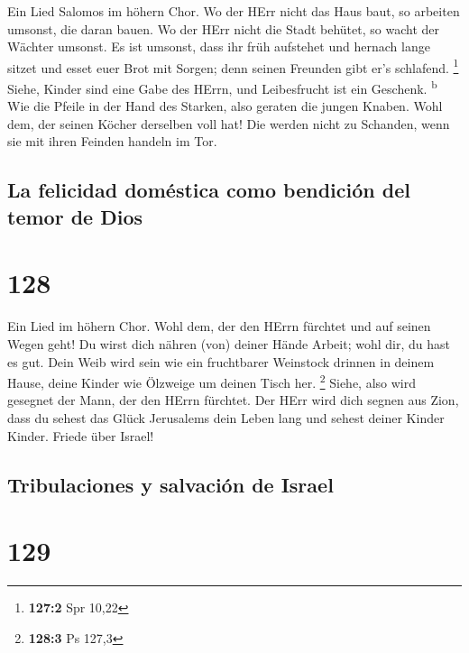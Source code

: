  Ein Lied Salomos im höhern Chor. Wo der HErr nicht das
Haus baut, so arbeiten umsonst, die daran bauen. Wo der HErr nicht die
Stadt behütet, so wacht der Wächter umsonst.  Es ist
umsonst, dass ihr früh aufstehet und hernach lange sitzet und esset euer
Brot mit Sorgen; denn seinen Freunden gibt er's schlafend. \footnote{\textbf{127:2}
  Spr 10,22}  Siehe, Kinder sind eine Gabe des HErrn, und
Leibesfrucht ist ein Geschenk. \textsuperscript{b}  Wie
die Pfeile in der Hand des Starken, also geraten die jungen Knaben.
 Wohl dem, der seinen Köcher derselben voll hat! Die
werden nicht zu Schanden, wenn sie mit ihren Feinden handeln im Tor.

\hypertarget{la-felicidad-domuxe9stica-como-bendiciuxf3n-del-temor-de-dios}{%
\subsection{La felicidad doméstica como bendición del temor de
Dios}\label{la-felicidad-domuxe9stica-como-bendiciuxf3n-del-temor-de-dios}}

\hypertarget{section-127}{%
\section{128}\label{section-127}}

 Ein Lied im höhern Chor. Wohl dem, der den HErrn fürchtet
und auf seinen Wegen geht!  Du wirst dich nähren (von)
deiner Hände Arbeit; wohl dir, du hast es gut.  Dein Weib
wird sein wie ein fruchtbarer Weinstock drinnen in deinem Hause, deine
Kinder wie Ölzweige um deinen Tisch her. \footnote{\textbf{128:3} Ps
  127,3}  Siehe, also wird gesegnet der Mann, der den
HErrn fürchtet.  Der HErr wird dich segnen aus Zion, dass
du sehest das Glück Jerusalems dein Leben lang  und sehest
deiner Kinder Kinder. Friede über Israel!

\hypertarget{tribulaciones-y-salvaciuxf3n-de-israel}{%
\subsection{Tribulaciones y salvación de
Israel}\label{tribulaciones-y-salvaciuxf3n-de-israel}}

\hypertarget{section-128}{%
\section{129}\label{section-128}}

